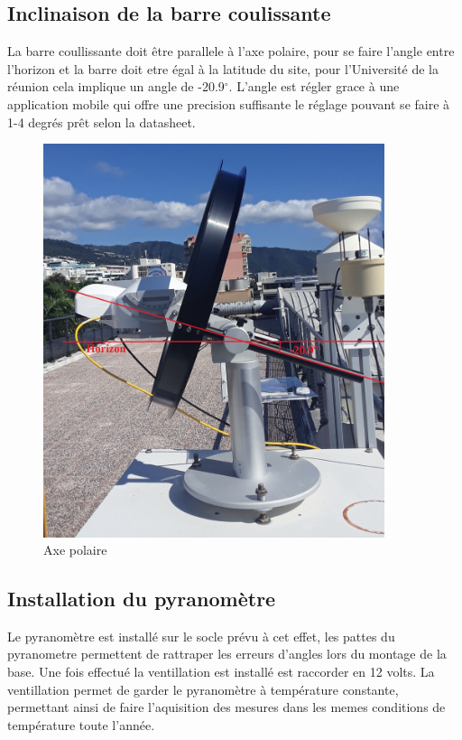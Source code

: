 \documentclass[12pt,a4paper]{article}
\begin{document}
\begin{flushleft}
\subsection{Inclinaison de la barre coulissante}

La barre coullissante doit être parallele à l'axe polaire, pour se faire l'angle entre l'horizon et la barre doit etre égal à la latitude du site, pour l'Université de la réunion cela implique un angle de -20.9$^\circ$. L'angle est régler grace à une application mobile qui offre une precision suffisante le réglage pouvant se faire à 1-4 degrés prêt selon la datasheet.

\begin{figure}[H]
\centering
\includegraphics[width=10cm]{image/montage/3.jpg} 
\caption{Axe polaire}
\end{figure}

\subsection{Installation du pyranomètre}

Le pyranomètre est installé sur le socle prévu à cet effet, les pattes du pyranometre permettent de rattraper les erreurs d'angles lors du montage de la base. Une fois effectué la ventillation est installé est raccorder en 12 volts. La ventillation permet de garder le pyranomètre à température constante, permettant ainsi de faire l'aquisition des mesures dans les memes conditions de température toute l'année.


\end{flushleft}
\end{document}
